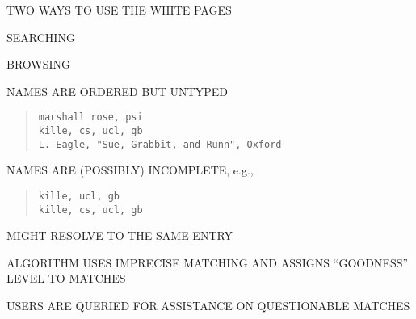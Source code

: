 



\begin{bwslide}

\begin{nrtc}
\item	TWO WAYS TO USE THE WHITE PAGES
    \begin{nrtc}
    \item	SEARCHING

    \item	BROWSING
    \end{nrtc}
\end{nrtc}
\end{bwslide}


\begin{bwslide}

\begin{nrtc}
\item	NAMES ARE ORDERED BUT UNTYPED
\begin{quote}\small\begin{verbatim}
marshall rose, psi
kille, cs, ucl, gb
L. Eagle, "Sue, Grabbit, and Runn", Oxford
\end{verbatim}\end{quote}

\item	NAMES ARE (POSSIBLY) INCOMPLETE, e.g.,
\begin{quote}\small\begin{verbatim}
kille, ucl, gb
kille, cs, ucl, gb
\end{verbatim}\end{quote}
	MIGHT RESOLVE TO THE SAME ENTRY

\item	ALGORITHM USES IMPRECISE MATCHING AND ASSIGNS ``GOODNESS'' LEVEL TO
	MATCHES

\item	USERS ARE QUERIED FOR ASSISTANCE ON QUESTIONABLE MATCHES
\end{nrtc}
\end{bwslide}


